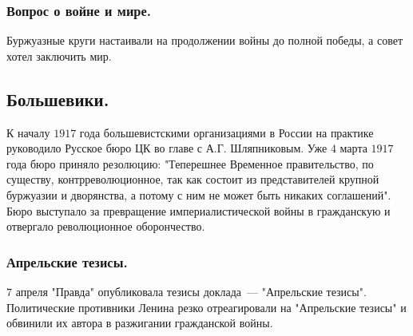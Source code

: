 \documentclass[12pt]{article}
\begin{document}
	\subsubsection{Вопрос о войне и мире.}
	Буржуазные круги настаивали на продолжении войны до полной победы, а совет хотел заключить мир.
	\subsection{Большевики.}
	К началу $1917$ года большевистскими организациями в России на практике руководило Русское бюро ЦК во главе с А.Г. Шляпниковым. Уже $4$ марта $1917$ года бюро приняло резолюцию: "Теперешнее Временное правительство, по существу, контрреволюционное, так как состоит из представителей крупной буржуазии и дворянства, а потому с ним не может быть никаких соглашений". Бюро выступало за превращение империалистической войны в гражданскую и отвергало революционное оборончество.
	\subsubsection{Апрельские тезисы.}
	$7$ апреля "Правда" опубликовала тезисы доклада~--- "Апрельские тезисы". Политические противники Ленина резко отреагировали на "Апрельские тезисы" и обвинили их автора в разжигании гражданской войны.
\end{document}

